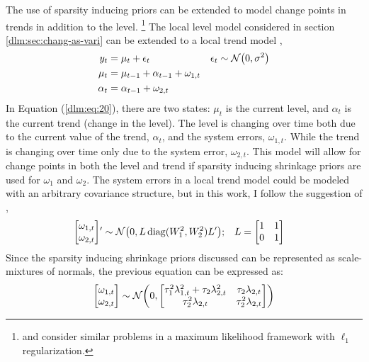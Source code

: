 \documentclass[12pt]{article}
\begin{document}
The use of sparsity inducing priors can be extended to model change points in trends in addition to the level.%
\footnote{\textcite{KimKohBoydEtAl2009} and \textcite{Tibshirani2014} consider similar problems in a maximum likelihood framework with $\ell_{1}$ regularization.}
The local level model considered in section \ref{dlm:sec:chang-as-vari} can be extended to a local trend model \parencites[Ch 3.2]{DurbinKoopman2012}[Ch 7]{WestHarrison1997},
\begin{equation}
  \label{dlm:eq:20}
  \begin{aligned}[t]
    y_{t} &= \mu_{t} + \epsilon_{t} & \epsilon_{t} & \sim \mathcal{N}\mathopen{}\left(0, \sigma^{2}\right)\mathclose{} \\
    \mu_{t} &= \mu_{t - 1} + \alpha_{t - 1} + \omega_{1, t} \\
    \alpha_{t} &= \alpha_{t - 1} + \omega_{2, t}
  \end{aligned}
\end{equation}
In Equation (\ref{dlm:eq:20}), there are two states: $\mu_{t}$ is the current level, and $\alpha_{t}$ is the current trend (change in the level).
The level is changing over time both due to the current value of the trend, $\alpha_{t}$, and the system errors, $\omega_{1,t}$.
While the trend is changing over time only due to the system error, $\omega_{2,t}$.
This model will allow for change points in both the level and trend if sparsity inducing shrinkage priors are used for $\omega_{1}$ and $\omega_{2}$.
The system errors in a local trend model could be modeled with an arbitrary covariance structure, but in this work, I follow the suggestion of \textcite[Ch 7.]{WestHarrison1997},
\begin{equation}
  \label{dlm:eq:29}
  \begin{aligned}[t]
  \begin{bmatrix}
    \omega_{1, t} \\
    \omega_{2, t}
  \end{bmatrix}
  & '\sim \mathcal{N}\mathopen{}\left(0,
    L \operatorname{diag}(W_{1}^{2}, W_{2}^{2}) L'
  \right)\mathclose{} ; &
  L &=
  \begin{bmatrix}
    1 & 1 \\
    0 & 1
  \end{bmatrix}
  \end{aligned}
\end{equation}
Since the sparsity inducing shrinkage priors discussed can be represented as scale-mixtures of normals, the previous equation can be expressed as:
\begin{equation}
\label{dlm:eq:26}
\begin{bmatrix}
  \omega_{1, t} \\
  \omega_{2, t}
\end{bmatrix}
\sim \mathcal{N}\mathopen{}\left(0,
  \begin{bmatrix}
    \tau_{1}^{2} \lambda_{1, t}^{2} + \tau_{2} \lambda_{2, t}^{2} & \tau_{2} \lambda_{2, t} \\
    \tau_{2}^{2} \lambda_{2, t} & \tau_{2}^{2} \lambda_{2, t}
  \end{bmatrix}
\right)\mathclose{}
\end{equation}
\end{document}
